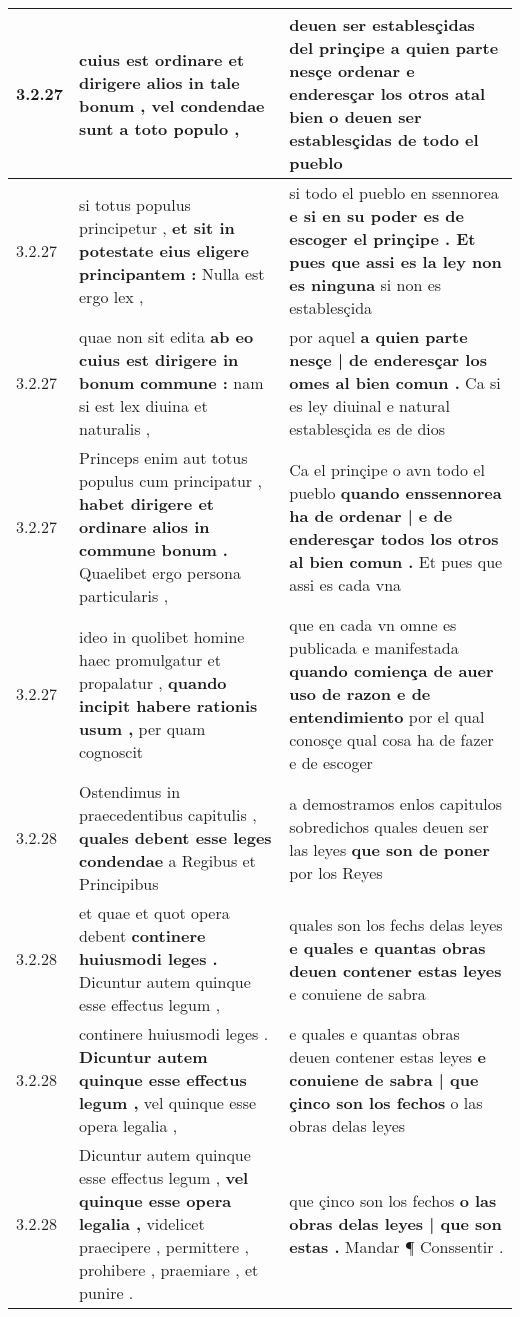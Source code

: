 \begin{tabular}{|p{1cm}|p{6.5cm}|p{6.5cm}|}
3.2.27 & cuius est ordinare \textbf{ et dirigere alios in tale bonum , } vel condendae sunt a toto populo , & deuen ser establesçidas del prinçipe \textbf{ a quien parte nesçe ordenar e enderesçar los otros atal bien } o deuen ser establesçidas de todo el pueblo \\\hline
3.2.27 & si totus populus principetur , \textbf{ et sit in potestate eius eligere principantem : } Nulla est ergo lex , & si todo el pueblo en ssennorea \textbf{ e si en su poder es de escoger el prinçipe . Et pues que assi es la ley non es ninguna } si non es establesçida \\\hline
3.2.27 & quae non sit edita \textbf{ ab eo cuius est dirigere in bonum commune : } nam si est lex diuina et naturalis , & por aquel \textbf{ a quien parte nesçe | de enderesçar los omes al bien comun . } Ca si es ley diuinal e natural establesçida es de dios \\\hline
3.2.27 & Princeps enim aut totus populus cum principatur , \textbf{ habet dirigere et ordinare alios in commune bonum . } Quaelibet ergo persona particularis , & Ca el prinçipe o avn todo el pueblo \textbf{ quando enssennorea ha de ordenar | e de enderesçar todos los otros al bien comun . } Et pues que assi es cada vna \\\hline
3.2.27 & ideo in quolibet homine haec promulgatur et propalatur , \textbf{ quando incipit habere rationis usum , } per quam cognoscit & que en cada vn omne es publicada e manifestada \textbf{ quando comiença de auer uso de razon e de entendimiento } por el qual conosçe qual cosa ha de fazer e de escoger \\\hline
3.2.28 & Ostendimus in praecedentibus capitulis , \textbf{ quales debent esse leges condendae } a Regibus et Principibus & a demostramos enlos capitulos sobredichos quales deuen ser las leyes \textbf{ que son de poner } por los Reyes \\\hline
3.2.28 & et quae et quot opera debent \textbf{ continere huiusmodi leges . } Dicuntur autem quinque esse effectus legum , & quales son los fechs delas leyes \textbf{ e quales e quantas obras deuen contener estas leyes } e conuiene de sabra \\\hline
3.2.28 & continere huiusmodi leges . \textbf{ Dicuntur autem quinque esse effectus legum , } vel quinque esse opera legalia , & e quales e quantas obras deuen contener estas leyes \textbf{ e conuiene de sabra | que çinco son los fechos } o las obras delas leyes \\\hline
3.2.28 & Dicuntur autem quinque esse effectus legum , \textbf{ vel quinque esse opera legalia , } videlicet praecipere , permittere , prohibere , praemiare , et punire . & que çinco son los fechos \textbf{ o las obras delas leyes | que son estas . } Mandar ¶ Conssentir . \\\hline

\end{tabular}
